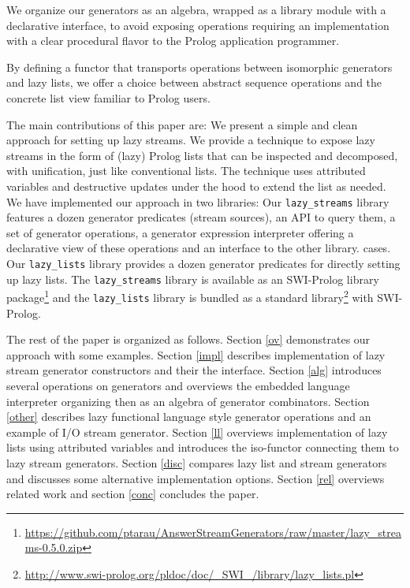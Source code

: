 \documentclass{new_tlp}
\begin{document}
We organize our generators as an algebra, wrapped as a library module with a declarative interface, to avoid exposing  operations requiring an implementation with a clear procedural flavor to the Prolog application programmer.

By defining a functor that transports operations between isomorphic
generators and lazy lists, we offer a choice between 
abstract sequence operations and the concrete list view familiar to Prolog users.



The main contributions of this paper are:
\BI
\I We present a simple and clean approach for setting up lazy streams.
\I We provide a technique to expose lazy streams in the form of (lazy) Prolog lists
   that can be inspected and decomposed, with unification, just like conventional lists.
   The technique uses attributed variables and destructive updates under the hood to
   extend the list as needed.
\I We have implemented our approach in two libraries:
   \BI 
   \I Our \texttt{lazy\_streams} library
features a dozen generator predicates (stream sources), an API to query
them, a set of generator  operations, a generator expression interpreter
offering a declarative view of these operations and an interface to
the other library. 
cases.
   \I Our \texttt{lazy\_lists} library provides a dozen generator predicates for 
      directly setting up lazy lists.
   \EI
   The \texttt{lazy\_streams} library is available as an SWI-Prolog
library package\footnote{
\url{https://github.com/ptarau/AnswerStreamGenerators/raw/master/lazy_streams-0.5.0.zip}}
  and the \texttt{lazy\_lists} library is bundled as a standard library\footnote{\url{http://www.swi-prolog.org/pldoc/doc/_SWI_/library/lazy_lists.pl}} with SWI-Prolog.
\EI

The rest of the paper is organized as follows.
Section \ref{ov} demonstrates our approach with some examples.
Section \ref{impl} describes implementation of lazy stream generator constructors and 
their the interface.
Section \ref{alg} introduces several operations on generators and overviews the
embedded language interpreter organizing then as an algebra of generator combinators.
Section \ref{other} describes lazy functional language style generator operations
and an example of I/O stream generator.
Section \ref{ll} overviews implementation of lazy lists using attributed variables
and introduces the iso-functor connecting them to  lazy stream generators.
Section \ref{disc} compares lazy list and stream generators 
and discusses some alternative implementation options. 
Section \ref{rel} overviews related work and
section \ref{conc} concludes the paper.
\end{document}
